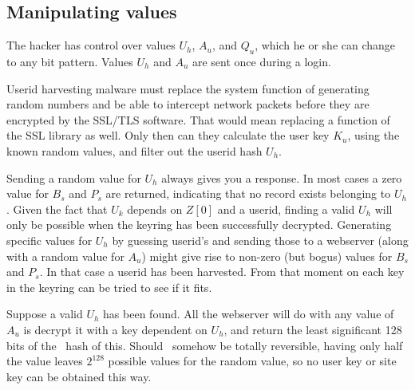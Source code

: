 \subsection{Manipulating values}
\label{sec:manipulating_values}
The hacker has control over values $U_h$, $A_u$, and $Q_u$, which he or she can change to any bit pattern.
Values $U_h$ and $A_u$ are sent once during a login.
\par
Userid harvesting malware must replace the system function of generating random numbers
and be able to intercept network packets before they are encrypted by the SSL/TLS software.
That would mean replacing a function of the SSL library as well.
Only then can they calculate the user key $K_u$,
using the known random values,
and filter out the userid hash $U_h$.
\par
Sending a random value for $U_h$ always gives you a response.
In most cases a zero value for $B_s$ and $P_s$ are returned,
indicating that no record exists belonging to $U_h$.
Given the fact that $U_k$ depends on $Z[0]$ and a userid,
finding a valid $U_h$ will only be possible when the keyring
has been successfully decrypted.
Generating specific values for $U_h$ by guessing userid's and sending those to a webserver
(along with a random value for $A_u$)
might give rise to non-zero
(but bogus)
values for $B_s$ and $P_s$.
In that case a userid has been harvested.
From that moment on each key in the keyring can be tried to see if it fits.
\par
Suppose a valid $U_h$ has been found.
All the webserver will do with any value of $A_u$ is decrypt it with a key dependent on $U_h$,
and return the least significant 128 bits of the \SHA\ hash of this.
Should \SHA\ somehow be totally reversible,
having only half the value leaves $2^{128}$ possible values for the random value,
so no user key or site key can be obtained this way.
\clearpage
